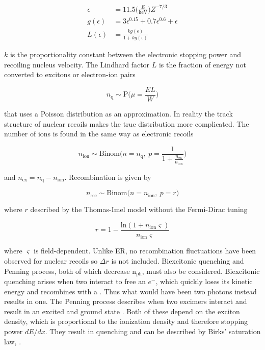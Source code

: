 \begin{subequations}
\begin{align}
\epsilon &= 11.5 \bigg( \frac{E}{\mathrm{keV}} \bigg) Z^{-7/3} \\
g( \epsilon ) &= 3 \epsilon ^{0.15} + 0.7 \epsilon ^{0.6} + \epsilon \\
L( \epsilon ) &= \frac{k g( \epsilon ) }{1 + k g( \epsilon )}
\end{align}
\label{eq:er_nr_calibrations_parameter_determ_nr_lindhard}
\end{subequations}

$k$ is the proportionality constant between the electronic stopping power and recoiling nucleus velocity.  The Lindhard factor
$L$ is the fraction of energy not converted to excitons or electron-ion pairs

\begin{equation}
n_{\mathrm{q}} \sim \mathrm{P} \bigg( \mu = \frac{E L}{W} \bigg)
\label{eq:er_nr_calibrations_parameter_determ_nr_quanta}
\end{equation}

\noindent that uses a Poisson distribution as an approximation.  In reality the track structure of nuclear recoils makes the true
distribution more complicated.  The number of ions is found in the same way as electronic recoils

\begin{equation}
n_{\mathrm{ion}} \sim \mathrm{Binom} \Bigg(n = n_{\mathrm{q}},\ p = \frac{1}{1 + \frac{n_{\mathrm{ex}}}{n_{\mathrm{ion}}}} \Bigg)
\end{equation}

\noindent and $n_{\mathrm{ex}} = n_{\mathrm{q}} - n_{\mathrm{ion}}$.  Recombination is given by

\begin{equation}
n_{\mathrm{rec}} \sim \mathrm{Binom} \big(n = n_{\mathrm{ion}},\ p = r \big)
\end{equation}

\noindent where $r$ described by the Thomas-Imel model without the Fermi-Dirac tuning

\begin{equation}
r = 1 - \frac{\mathrm{ln} (1 + n_{\mathrm{ion}} \varsigma)}{n_{\mathrm{ion}} \varsigma}
\end{equation}

\noindent where $\varsigma$ is field-dependent.  Unlike ER, no recombination fluctuations have been observed for nuclear recoils so
$\Delta r$ is not included.  Biexcitonic quenching and Penning process, both of which decrease
$\mathrm{n_{ph}}$, must also be considered.  Biexcitonic quenching arises when two
 interact to free an $e^-$, which quickly loses its kinetic energy
and recombines with a .  Thus what would have been two photons instead results in one.  The Penning process describes when
two excimers interact and result in an excited and ground state .  Both of these depend on the exciton density, which
is proportional to the ionization density and therefore stopping power $dE / dx$.  They result in quenching and can be
described by Birks' saturation law,  .

